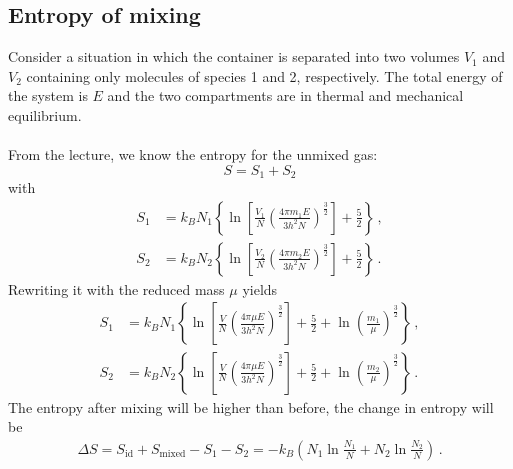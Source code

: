 \newpage
\subsection{Entropy of mixing}
    Consider a situation in which the container is separated into two volumes 
    $V_1$ and $V_2$ containing only molecules of species 1 and 2, respectively. 
    The total energy of the system is $E$ and the two compartments are in 
    thermal and mechanical equilibrium. \\
    \\
    From the lecture, we know the entropy for the unmixed gas:
    \begin{equation}
        S = S_1 + S_2
    \end{equation}
    with 
    \begin{align}
    S_1 &= k_B N_1 \left\{ \ln\left[ \frac{V_1}{N} \left( \frac{4\pi m_1 E}{3h^2N} \right)^{\frac{3}{2}}  \right] + \frac{5}{2} \right\} \,, \\
    S_2 &= k_B N_2 \left\{ \ln\left[ \frac{V_2}{N} \left( \frac{4\pi m_2 E}{3h^2N} \right)^{\frac{3}{2}}  \right] + \frac{5}{2} \right\} \,.
    \end{align}
    Rewriting it with the reduced mass $\mu$ yields
    \begin{align}
    S_1 &= k_B N_1 \left\{ \ln\left[ \frac{V}{N} \left( \frac{4\pi \mu E}{3h^2N} \right)^{\frac{3}{2}}  \right] + \frac{5}{2} + \ln\left( \frac{m_1}{\mu} \right)^{\frac{3}{2}} \right\} \,, \\
    S_2 &= k_B N_2 \left\{ \ln\left[ \frac{V}{N} \left( \frac{4\pi \mu E}{3h^2N} \right)^{\frac{3}{2}}  \right] + \frac{5}{2} + \ln\left( \frac{m_2}{\mu} \right)^{\frac{3}{2}} \right\} \,.
    \end{align}
    The entropy after mixing will be higher than before, the change in entropy will be
    \begin{align}
    \Delta S = S_{\text{id}} + S_{\text{mixed}} - S_1 - S_2 = - k_B \left( N_1 \ln\frac{N_1}{N} + N_2 \ln\frac{N_2}{N} \right) \,.
    \end{align}
